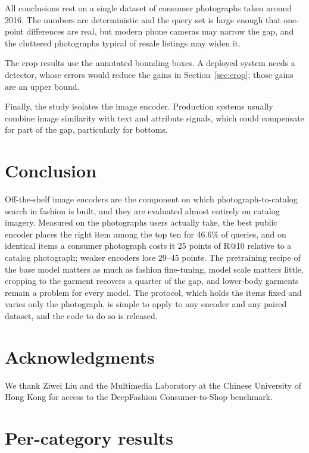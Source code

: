 \documentclass[10pt,twocolumn,letterpaper]{article}
\makeatletter
\newcommand{\recall}[1]{R@#1}
\makeatother
\begin{document}
All conclusions rest on a single dataset of consumer photographs taken around 2016. The numbers are deterministic and the query set is large enough that one-point differences are real, but modern phone cameras may narrow the gap, and the cluttered photographs typical of resale listings may widen it.

The crop results use the annotated bounding boxes. A deployed system needs a detector, whose errors would reduce the gains in Section~\ref{sec:crop}; those gains are an upper bound.

Finally, the study isolates the image encoder. Production systems usually combine image similarity with text and attribute signals, which could compensate for part of the gap, particularly for bottoms.

\section{Conclusion}

Off-the-shelf image encoders are the component on which photograph-to-catalog search in fashion is built, and they are evaluated almost entirely on catalog imagery. Measured on the photographs users actually take, the best public encoder places the right item among the top ten for 46.6\% of queries, and on identical items a consumer photograph costs it 25 points of \recall{10} relative to a catalog photograph; weaker encoders lose 29--45 points. The pretraining recipe of the base model matters as much as fashion fine-tuning, model scale matters little, cropping to the garment recovers a quarter of the gap, and lower-body garments remain a problem for every model. The protocol, which holds the items fixed and varies only the photograph, is simple to apply to any encoder and any paired dataset, and the code to do so is released.

\section*{Acknowledgments}
We thank Ziwei Liu and the Multimedia Laboratory at the Chinese University of Hong Kong for access to the DeepFashion Consumer-to-Shop benchmark.




\appendix

\section{Per-category results}
\label{app:category}
\end{document}
